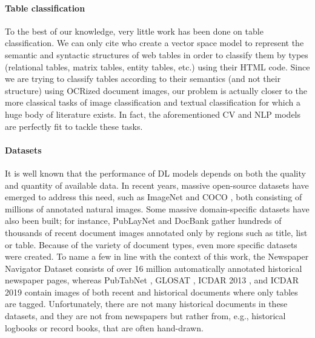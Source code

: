 \paragraph{Table classification}
To the best of our knowledge, very little work has been done on table classification. We can only cite \citet{ghasemi-gol_tabvec_2018} who create a vector space model to represent the semantic and syntactic structures of web tables in order to classify them by types (relational tables, matrix tables, entity tables, etc.) using their HTML code. Since we are trying to classify tables according to their semantics (and not their structure) using OCRized document images, our problem is actually closer to the more classical tasks of image classification and textual classification for which a huge body of literature exists. In fact, the aforementioned CV and NLP models are perfectly fit to tackle these tasks.

\paragraph{Datasets}
It is well known that the performance of DL models depends on both the quality and quantity of available data. In recent years, massive open-source datasets have emerged to address this need, such as ImageNet \citep{deng_imagenet_2009} and COCO \citep{lin_microsoft_2014}, both consisting of millions of annotated natural images. Some massive domain-specific datasets have also been built; for instance, PubLayNet \citep{zhong_publaynet_2019} and DocBank \citep{li_docbank_2020} gather hundreds of thousands of recent document images annotated only by regions such as title, list or table. Because of the variety of document types, even more specific datasets were created. To name a few in line with the context of this work, the Newspaper Navigator Dataset \citep{lee_newspaper_2020} consists of over 16 million automatically annotated historical newspaper pages, whereas PubTabNet \citep{vedaldi_image-based_2020}, GLOSAT \citep{ziomek_glosat_2021}, ICDAR 2013 \citep{gobel_icdar_2013}, and ICDAR 2019 \citep{gao_icdar_2019} contain images of both recent and historical documents where only tables are tagged. Unfortunately, there are not many historical documents in these datasets, and they are not from newspapers but rather from, e.g., historical logbooks or record books, that are often hand-drawn. 